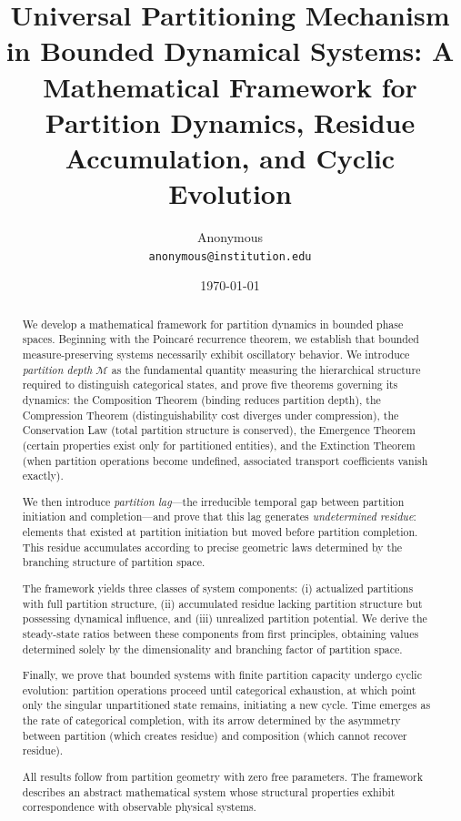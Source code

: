 \documentclass[twocolumn,10pt,a4paper]{article}
\theoremstyle{definition}
\theoremstyle{remark}
\newcommand{\Depth}{\mathcal{M}}
\begin{document}
\title{\textbf{Universal Partitioning Mechanism in Bounded Dynamical Systems: A Mathematical Framework for Partition Dynamics, Residue Accumulation, and Cyclic Evolution}}

\author{
Anonymous\\
\texttt{anonymous@institution.edu}
}

\date{\today}

\maketitle

\begin{abstract}
\noindent We develop a mathematical framework for partition dynamics in bounded phase spaces. Beginning with the Poincar\'{e} recurrence theorem, we establish that bounded measure-preserving systems necessarily exhibit oscillatory behavior. We introduce \emph{partition depth} $\Depth$ as the fundamental quantity measuring the hierarchical structure required to distinguish categorical states, and prove five theorems governing its dynamics: the Composition Theorem (binding reduces partition depth), the Compression Theorem (distinguishability cost diverges under compression), the Conservation Law (total partition structure is conserved), the Emergence Theorem (certain properties exist only for partitioned entities), and the Extinction Theorem (when partition operations become undefined, associated transport coefficients vanish exactly).

We then introduce \emph{partition lag}---the irreducible temporal gap between partition initiation and completion---and prove that this lag generates \emph{undetermined residue}: elements that existed at partition initiation but moved before partition completion. This residue accumulates according to precise geometric laws determined by the branching structure of partition space.

The framework yields three classes of system components: (i) actualized partitions with full partition structure, (ii) accumulated residue lacking partition structure but possessing dynamical influence, and (iii) unrealized partition potential. We derive the steady-state ratios between these components from first principles, obtaining values determined solely by the dimensionality and branching factor of partition space.

Finally, we prove that bounded systems with finite partition capacity undergo cyclic evolution: partition operations proceed until categorical exhaustion, at which point only the singular unpartitioned state remains, initiating a new cycle. Time emerges as the rate of categorical completion, with its arrow determined by the asymmetry between partition (which creates residue) and composition (which cannot recover residue).

All results follow from partition geometry with zero free parameters. The framework describes an abstract mathematical system whose structural properties exhibit correspondence with observable physical systems.
\end{abstract}
\end{document}
